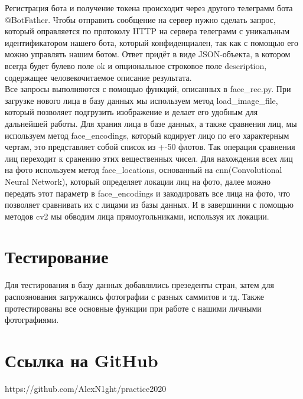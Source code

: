 Регистрация бота и получение токена происходит через другого телеграмм бота @BotFather. Чтобы отправить сообщение на сервер нужно сделать запрос, который оправляется по протоколу HTTP на сервера телеграмм с уникальным идентификатором нашего бота,   который конфиденциален, так как с помощью его можно управлять нашим ботом. Ответ придёт в виде  JSON-объекта,  в котором всегда будет булево поле  ok  и опциональное строковое поле  description,  содержащее человекочитаемое описание результата.\\
Все запросы выполняются с помощью функций, описанных в face\_rec.py. При загрузке нового лица в базу данных мы используем метод load\_image\_file, который позволяет подгрузить изображение и делает его удобным для дальнейшей работы. Для храния лица в базе данных, а также сравнения лиц, мы используем метод face\_encodings, который кодирует лицо по его характерным чертам, это представляет собой список из +-50 флотов. Так операция сравнения лиц переходит к сранению этих вещественных чисел. Для нахождения всех лиц на фото используем метод face\_locations, основанный на cnn(Convolutional Neural Network), который определяет локации лиц на фото, далее можно передать этот параметр в face\_encodings и закодировать все лица на фото, что позволяет сравнивать их с лицами из базы данных. И в завершинии с помощью методов cv2 мы обводим лица прямоугольниками, используя их локации.    

\section*{Тестирование}

Для тестирования в базу данных добавлялись презеденты стран, затем для распознования загружались фотографии с разных саммитов и тд. Также протестированы все основные функции при работе с нашими личными фотографиями.

\section*{Ссылка на GitHub} https://github.com/AlexN1ght/practice2020
\pagebreak
